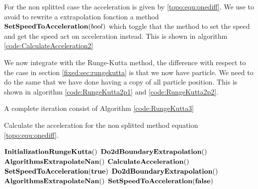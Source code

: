 For the non splitted case the acceleration is given by \ref{topo:equ:onediff}.
We use to avoid to rewrite a extrapolation fonction a method $\mathop{\textbf{SetSpeedToAcceleration}}(bool)$
which toggle that the method to set the speed and get the speed act on acceleration instead.
This is shown in algorithm \ref{code:CalculateAcceleration2}

We now integrate with the Runge-Kutta method, the difference with respect to the case in section \ref{fixed:sec:rungekutta}
is that we now have particle. We need to do the same that we have done having a copy of all particle position.
This is shown in algorithm \ref{code:RungeKutta2p1} and \ref{code:RungeKutta2p2}.

A complete iteration consist of Algorithm \ref{code:RungeKutta3}

\begin{algorithm}
\caption{Calculate the acceleration for the non splitted method equation \ref{topo:equ:onediff}.}
\label{code:CalculateAcceleration2}
\begin{algorithmic}[1]
	\State $\mathop{\textbf{InitializationRungeKutta}}()$
	\State $\mathop{\textbf{Do2dBoundaryExtrapolation}}()$
	\State $\mathop{\textbf{AlgorithmsExtrapolateNan}}()$
	\State $\mathop{\textbf{CalculateAcceleration}}()$
	\State $\mathop{\textbf{SetSpeedToAcceleration}}(\mathop{\textbf{true}})$
	\State $\mathop{\textbf{Do2dBoundaryExtrapolation}}()$
	\State $\mathop{\textbf{AlgorithmsExtrapolateNan}}()$
	\State $\mathop{\textbf{SetSpeedToAcceleration}}(\mathop{\textbf{false}})$
\EndProcedure
        \end{algorithmic}
\end{algorithm}


